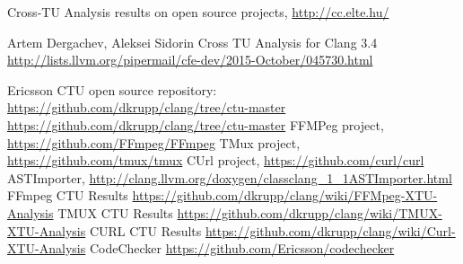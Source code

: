 \documentclass{article}
\begin{document}
\begin{thebibliography}{9}
 Cross-TU Analysis results on open source projects, \url{http://cc.elte.hu/}

 Artem Dergachev, Aleksei Sidorin Cross TU Analysis for Clang 
3.4 \url{http://lists.llvm.org/pipermail/cfe-dev/2015-October/045730.html}

 Ericsson CTU open source repository: \url{https://github.com/dkrupp/clang/tree/ctu-master}
 \url{https://github.com/dkrupp/clang/tree/ctu-master}
 FFMPeg project,  \url{https://github.com/FFmpeg/FFmpeg}
 TMux project, \url{https://github.com/tmux/tmux}
 CUrl project, \url{https://github.com/curl/curl}
 ASTImporter, \url{http://clang.llvm.org/doxygen/classclang_1_1ASTImporter.html}
 FFmpeg CTU Results {\small \url{https://github.com/dkrupp/clang/wiki/FFMpeg-XTU-Analysis}}
 TMUX CTU Results \url{https://github.com/dkrupp/clang/wiki/TMUX-XTU-Analysis}
 CURL CTU Results \url{https://github.com/dkrupp/clang/wiki/Curl-XTU-Analysis}
 CodeChecker \url{https://github.com/Ericsson/codechecker}
\end{thebibliography}
\end{document}
